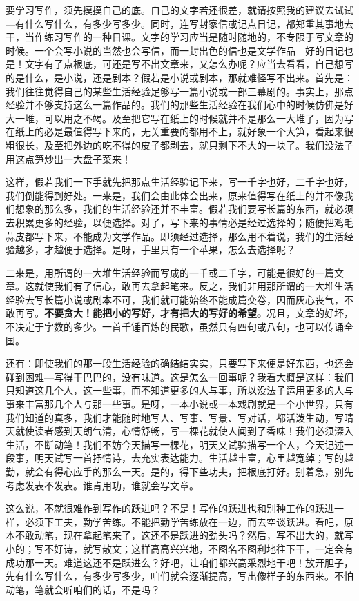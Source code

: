 \documentclass[fontset=fandol,12pt,a5paper]{ctexbook}
\begin{document}
要学习写作，须先摸摸自己的底。自己的文字若还很差，就请按照我的建议去试试—有什么写什么，有多少写多少。同时，连写封家信或记点日记，都郑重其事地去干，当作练习写作的一种日课。文字的学习应当是随时随地的，不专限于写文章的时候。一个会写小说的当然也会写信，而一封出色的信也是文学作品—好的日记也是！文字有了点根底，可还是写不出文章来，又怎么办呢？应当去看看，自己想写的是什么，是小说，还是剧本？假若是小说或剧本，那就难怪写不出来。首先是：我们往往觉得自己的某些生活经验足够写一篇小说或一部三幕剧的。事实上，那点经验并不够支持这么一篇作品的。我们的那些生活经验在我们心中的时候仿佛是好大一堆，可以用之不竭。及至把它写在纸上的时候就并不是那么一大堆了，因为写在纸上的必是最值得写下来的，无关重要的都用不上，就好象一个大笋，看起来很粗很长，及至把外边的吃不得的皮子都剥去，就只剩下不大的一块了。我们没法子用这点笋炒出一大盘子菜来！

这样，假若我们一下手就先把那点生活经验记下来，写一千字也好，二千字也好，我们倒能得到好处。一来是，我们会由此体会出来，原来值得写在纸上的并不像我们想象的那么多，我们的生活经验还并不丰富。假若我们要写长篇的东西，就必须去积累更多的经验，以便选择。对了，写下来的事情必是经过选择的；随便把鸡毛蒜皮都写下来，不能成为文学作品。即须经过选择，那么用不着说，我们的生活经验越多，才越便于选择。是呀，手里只有一个苹果，怎么去选择呢？

二来是，用所谓的一大堆生活经验而写成的一千或二千字，可能是很好的一篇文章。这就使我们有了信心，敢再去拿起笔来。反之，我们非用那所谓的一大堆生活经验去写长篇小说或剧本不可，我们就可能始终不能成篇交卷，因而灰心丧气，不敢再写。\textbf{不要贪大！能把小的写好，才有把大的写好的希望。}况且，文章的好坏，不决定于字数的多少。一首千锤百炼的民歌，虽然只有四句或八句，也可以传诵全国。

还有：即使我们的那一段生活经验的确结结实实，只要写下来便是好东西，也还会碰到困难—写得干巴巴的，没有味道。这是怎么一回事呢？我看大概是这样：我们只知道这几个人，这一些事，而不知道更多的人与事，所以没法子运用更多的人与事来丰富那几个人与那一些事。是呀，一本小说或一本戏剧就是一个小世界，只有我们知道的真多，我们才能随时地写人、写事、写景、写对话，都活泼生动，写晴天就使读者感到天朗气清，心情舒畅，写一棵花就使人闻到了香味！我们必须深入生活，不断动笔！我们不妨今天描写一棵花，明天又试验描写一个人，今天记述一段事，明天试写一首抒情诗，去充实表达能力。生活越丰富，心里越宽绰；写的越勤，就会有得心应手的那么一天。是的，得下些功夫，把根底打好。别着急，别先考虑发表不发表。谁肯用功，谁就会写文章。

这么说，不就很难作到写作的跃进吗？不是！写作的跃进也和别种工作的跃进一样，必须下工夫，勤学苦练。不能把勤学苦练放在一边，而去空谈跃进。看吧，原本不敢动笔，现在拿起笔来了，这还不是跃进的劲头吗？然后，写不出大的，就写小的；写不好诗，就写散文；这样高高兴兴地，不图名不图利地往下干，一定会有成功那一天。难道这还不是跃进么？好吧，让咱们都兴高采烈地干吧！放开胆子，先有什么写什么，有多少写多少，咱们就会逐渐提高，写出像样子的东西来。不怕动笔，笔就会听咱们的话，不是吗？
\end{document}
